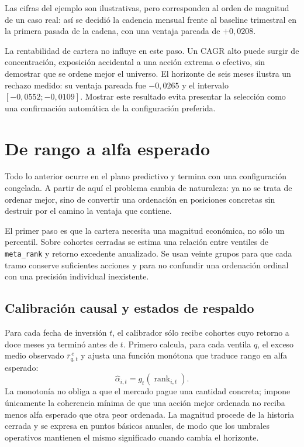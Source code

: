 Las cifras del ejemplo son ilustrativas, pero corresponden al orden de magnitud de un caso real: así
se decidió la cadencia mensual frente al baseline trimestral en la primera pasada de la cadena, con
una ventaja pareada de $+0{,}0208$.

La rentabilidad de cartera no influye en este paso. Un CAGR alto puede surgir de concentración,
exposición accidental a una acción extrema o efectivo, sin demostrar que se ordene mejor el
universo. El horizonte de seis meses ilustra un rechazo medido: su ventaja pareada fue $-0,0265$ y
el intervalo $[-0,0552;-0,0109]$. Mostrar este resultado evita presentar la selección como una
confirmación automática de la configuración preferida.

\section{De rango a alfa esperado}

Todo lo anterior ocurre en el plano predictivo y termina con una configuración congelada. A partir
de aquí el problema cambia de naturaleza: ya no se trata de ordenar mejor, sino de convertir una
ordenación en posiciones concretas sin destruir por el camino la ventaja que contiene.

El primer paso es que la cartera necesita una magnitud económica, no sólo un percentil. Sobre
cohortes cerradas se estima una relación entre ventiles de \texttt{meta\_rank} y retorno excedente
anualizado. Se usan veinte grupos para que cada tramo conserve suficientes acciones y para no
confundir una ordenación ordinal con una precisión individual inexistente.

\subsection*{Calibración causal y estados de respaldo}

Para cada fecha de inversión $t$, el calibrador sólo recibe cohortes cuyo retorno a doce meses ya
terminó antes de $t$. Primero calcula, para cada ventila $q$, el exceso medio observado
$\bar r^{\,e}_{q,t}$ y ajusta una función monótona que traduce rango en alfa esperado:
\[
 \widehat{\alpha}_{i,t}=g_t\!\left(\operatorname{rank}_{i,t}\right).
\]
La monotonía no obliga a que el mercado pague una cantidad concreta; impone únicamente la
coherencia mínima de que una acción mejor ordenada no reciba menos alfa esperado que otra peor
ordenada. La magnitud procede de la historia cerrada y se expresa en puntos básicos anuales, de
modo que los umbrales operativos mantienen el mismo significado cuando cambia el horizonte.

